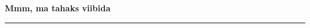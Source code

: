 \documentclass[10pt]{book}
\begin{document}
{
  \samepage
  \raggedbottom
  \raggedright
  \sloppy


  \vspace{0.2in}

  \noindent\begin{minipage}{.1\textwidth}
    \hfill\vspace{0.1in}
  \end{minipage}%
  \noindent\begin{minipage}{.8\textwidth}
    \centering
    \bfseries
    \large Mmm, ma tahaks viibida
  \end{minipage}%
  \noindent\begin{minipage}{.1\textwidth}
      \hfill\vspace{0.1in}
  \end{minipage}

  \nopagebreak[4]
  \vspace{0.1in}
  \nopagebreak[4]
  \hrule height 0.05ex
  \nopagebreak[4]
  \vspace{-0.05in}




}
\end{document}
